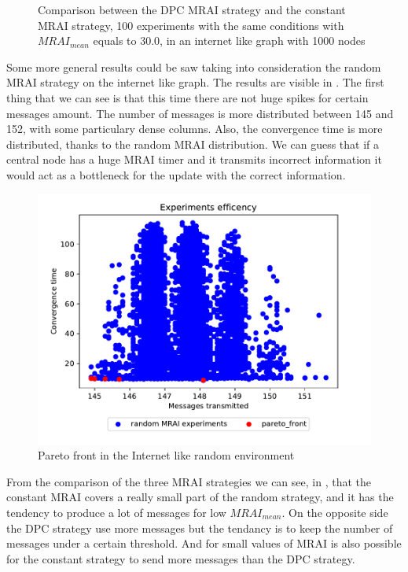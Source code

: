 \documentclass[10pt,conference,letterpaper]{IEEEtran}
\newcommand{\figwidth}{0.78}
\newcommand{\figvspace}{-1.5em}
\begin{document}
\begin{figure}[tb]
	\caption{Comparison between the \ac{DPC} \ac{MRAI} strategy and the constant \ac{MRAI}
			 strategy, 100 experiments with the same conditions with $MRAI_{mean}$
			 equals to \num{30.0}, in an internet like graph with \num{1000} nodes}
	\label{fig:dpc_vs_constant_1000}
	\vspace{\figvspace}
\end{figure}

Some more general results could be saw taking into consideration the random \ac{MRAI}
strategy on the internet like graph.
The results are visible in .
The first thing that we can see is that this time there are not huge spikes 
for certain messages amount.
The number of messages is more distributed between \num{145} and \num{152}, with 
some particulary dense columns.
Also, the convergence time is more distributed, thanks to the random \ac{MRAI} distribution.
We can guess that if a central node has a huge \ac{MRAI} timer and it transmits
incorrect information it would act as a bottleneck for the update with the 
correct information.

\begin{figure}[tb]
	\centering
	\includegraphics[width=\figwidth\columnwidth]{images/internet_like/graph-100-random/random-multiple_mrais}
	\caption{Pareto front in the Internet like random environment}
	\label{fig:random_mrai_pareto_freq}
	\vspace{\figvspace}
\end{figure}

From the comparison of the three \ac{MRAI} strategies we can see, in ,
that the constant \ac{MRAI} covers a really small part of the random strategy,
and it has the tendency to produce a lot of messages for low $MRAI_{mean}$.
On the opposite side the \ac{DPC} strategy use more messages but the tendancy
is to keep the number of messages under a certain threshold.
And for small values of \ac{MRAI} is also possible for the constant strategy
to send more messages than the \ac{DPC} strategy.
\end{document}
